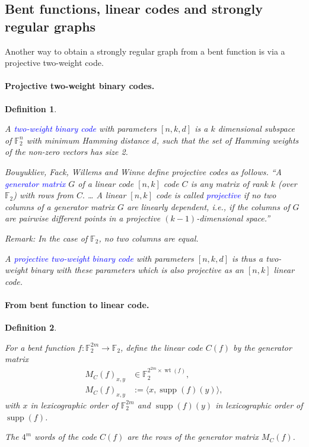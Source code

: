 \documentclass[12pt,a4paper]{article}
\newcommand{\mb}[1]{\mathbb{#1}}
\newcommand{\F}{\mb{F}}
\newcommand{\To}{\rightarrow}
\newcommand{\Emph}[1]{\emph{\textcolor{blue}{#1}}}
\newcommand{\support}[1]{\operatorname{supp}\left(#1\right)}
\newcommand{\weight}[1]{\operatorname{wt}\left(#1\right)}
\newtheorem{Definition}{Definition}
\begin{document}
%
\subsection{Bent functions, linear codes and strongly regular graphs}
Another way to obtain a strongly regular graph from a bent function is via a projective two-weight
code.
\paragraph*{Projective two-weight binary codes.}

\begin{Definition}
\label{def-two-weight-codes}
\cite{BouFFWW2006} \cite{Ton96uniformly}

A \Emph{two-weight binary code} with parameters $[n,k,d]$ is a $k$ dimensional subspace of $\F_2^n$
with
minimum Hamming distance $d$, such that the set of Hamming weights of the non-zero vectors has size
2.

Bouyukliev, Fack, Willems and Winne \cite[p. 60]{BouFFWW2006} define projective codes as follows.
``A \Emph{generator matrix} $G$ of a linear code $[n, k]$ code $C$ is any matrix
of rank $k$ (over $\F_2$) with rows from $C.$ \ldots
A linear $[n, k]$ code is called \Emph{projective} if no two columns of a generator matrix
$G$ are linearly dependent, i.e., if the columns of $G$ are pairwise different points in a
projective $(k-1)$-dimensional space.''

Remark: In the case of $\F_2$, no two columns are equal.

A \Emph{projective two-weight binary code} with parameters $[n, k, d]$ is thus a
two-weight binary with these parameters which is also projective as an $[n, k]$ linear code.
%
%
%
\end{Definition}

\paragraph*{From bent function to linear code.}
\begin{Definition}
\cite[Corollary 10]{DinD15class}

For a bent function $f : \F_2^{2m} \To \F_2$,
define the linear code $C(f)$ by the generator matrix
\begin{align*}
M_C(f)_{x,y} &\in \F_2^{2^{2m} \times \weight{f}},
\\
M_C(f)_{x,y} &:= \langle x, \support{f}(y) \rangle,
\end{align*}
with $x$ in lexicographic order of $\F_2^{2m}$
and $\support{f}(y)$ in lexicographic order of $\support{f}$.

The $4^m$ words of the code $C(f)$ are the rows of the generator matrix $M_C(f)$.
\end{Definition}
\end{document}
